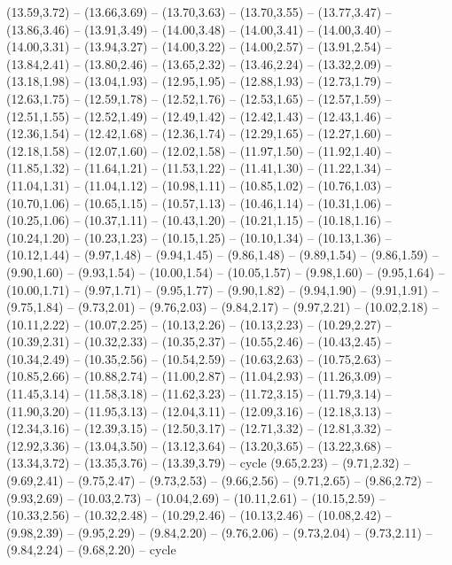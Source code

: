 \expandafter\def\csname geo:gebiet:TUR\endcsname{
  (13.59,3.72) -- (13.66,3.69) -- (13.70,3.63) -- (13.70,3.55) -- (13.77,3.47) -- (13.86,3.46) -- (13.91,3.49) -- (14.00,3.48) -- (14.00,3.41) -- (14.00,3.40) -- (14.00,3.31) -- (13.94,3.27) -- (14.00,3.22) -- (14.00,2.57) -- (13.91,2.54) -- (13.84,2.41) -- (13.80,2.46) -- (13.65,2.32) -- (13.46,2.24) -- (13.32,2.09) -- (13.18,1.98) -- (13.04,1.93) -- (12.95,1.95) -- (12.88,1.93) -- (12.73,1.79) -- (12.63,1.75) -- (12.59,1.78) -- (12.52,1.76) -- (12.53,1.65) -- (12.57,1.59) -- (12.51,1.55) -- (12.52,1.49) -- (12.49,1.42) -- (12.42,1.43) -- (12.43,1.46) -- (12.36,1.54) -- (12.42,1.68) -- (12.36,1.74) -- (12.29,1.65) -- (12.27,1.60) -- (12.18,1.58) -- (12.07,1.60) -- (12.02,1.58) -- (11.97,1.50) -- (11.92,1.40) -- (11.85,1.32) -- (11.64,1.21) -- (11.53,1.22) -- (11.41,1.30) -- (11.22,1.34) -- (11.04,1.31) -- (11.04,1.12) -- (10.98,1.11) -- (10.85,1.02) -- (10.76,1.03) -- (10.70,1.06) -- (10.65,1.15) -- (10.57,1.13) -- (10.46,1.14) -- (10.31,1.06) -- (10.25,1.06) -- (10.37,1.11) -- (10.43,1.20) -- (10.21,1.15) -- (10.18,1.16) -- (10.24,1.20) -- (10.23,1.23) -- (10.15,1.25) -- (10.10,1.34) -- (10.13,1.36) -- (10.12,1.44) -- (9.97,1.48) -- (9.94,1.45) -- (9.86,1.48) -- (9.89,1.54) -- (9.86,1.59) -- (9.90,1.60) -- (9.93,1.54) -- (10.00,1.54) -- (10.05,1.57) -- (9.98,1.60) -- (9.95,1.64) -- (10.00,1.71) -- (9.97,1.71) -- (9.95,1.77) -- (9.90,1.82) -- (9.94,1.90) -- (9.91,1.91) -- (9.75,1.84) -- (9.73,2.01) -- (9.76,2.03) -- (9.84,2.17) -- (9.97,2.21) -- (10.02,2.18) -- (10.11,2.22) -- (10.07,2.25) -- (10.13,2.26) -- (10.13,2.23) -- (10.29,2.27) -- (10.39,2.31) -- (10.32,2.33) -- (10.35,2.37) -- (10.55,2.46) -- (10.43,2.45) -- (10.34,2.49) -- (10.35,2.56) -- (10.54,2.59) -- (10.63,2.63) -- (10.75,2.63) -- (10.85,2.66) -- (10.88,2.74) -- (11.00,2.87) -- (11.04,2.93) -- (11.26,3.09) -- (11.45,3.14) -- (11.58,3.18) -- (11.62,3.23) -- (11.72,3.15) -- (11.79,3.14) -- (11.90,3.20) -- (11.95,3.13) -- (12.04,3.11) -- (12.09,3.16) -- (12.18,3.13) -- (12.34,3.16) -- (12.39,3.15) -- (12.50,3.17) -- (12.71,3.32) -- (12.81,3.32) -- (12.92,3.36) -- (13.04,3.50) -- (13.12,3.64) -- (13.20,3.65) -- (13.22,3.68) -- (13.34,3.72) -- (13.35,3.76) -- (13.39,3.79) -- cycle
  (9.65,2.23) -- (9.71,2.32) -- (9.69,2.41) -- (9.75,2.47) -- (9.73,2.53) -- (9.66,2.56) -- (9.71,2.65) -- (9.86,2.72) -- (9.93,2.69) -- (10.03,2.73) -- (10.04,2.69) -- (10.11,2.61) -- (10.15,2.59) -- (10.33,2.56) -- (10.32,2.48) -- (10.29,2.46) -- (10.13,2.46) -- (10.08,2.42) -- (9.98,2.39) -- (9.95,2.29) -- (9.84,2.20) -- (9.76,2.06) -- (9.73,2.04) -- (9.73,2.11) -- (9.84,2.24) -- (9.68,2.20) -- cycle}
